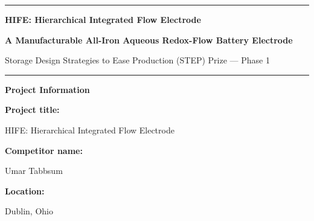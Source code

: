 \documentclass[11pt,letterpaper]{article}
\begin{document}

\thispagestyle{empty}

\vspace*{0.15in}

{\color{HIFENavy}\rule{\textwidth}{1.2pt}}

\vspace{0.15in}

\begin{center}

    {\LARGE\bfseries
    HIFE: Hierarchical Integrated Flow Electrode\par}

    \vspace{0.08in}

    {\large\bfseries
    A Manufacturable All-Iron Aqueous Redox-Flow Battery Electrode\par}

    \vspace{0.08in}

    {\large
    Storage Design Strategies to Ease Production (STEP) Prize --- Phase 1\par}

\end{center}

\vspace{0.15in}

{\color{HIFETeal}\rule{\textwidth}{0.8pt}}

\vspace{0.18in}

\noindent
{\large\bfseries\color{HIFENavy}
Project Information\par}

\vspace{0.45em}

\noindent
\textbf{Project title:}\par
HIFE: Hierarchical Integrated Flow Electrode

\vspace{0.30em}

\noindent
\textbf{Competitor name:}\par
Umar Tabbsum

\vspace{0.30em}

\noindent
\textbf{Location:}\par
Dublin, Ohio

\vspace{0.30em}
\end{document}
